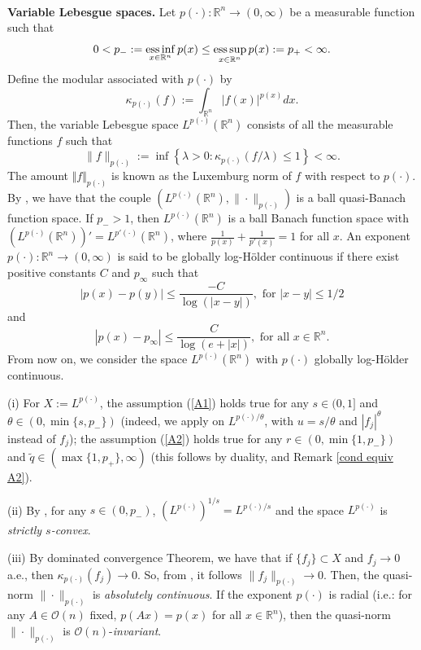 \documentclass[oneside,10pt]{article}
\newcommand\esssup{\mathop{\rm ess \, sup}}
\newcommand\essinf{\mathop{\rm ess \, inf}}
\begin{document}
\

{\bf Variable Lebesgue spaces.} Let $p(\cdot) : \mathbb{R}^n \to (0, \infty)$ be a measurable function such that
\[ 
0 < p_{-} := \essinf_{x \in \mathbb{R}^n} p(x) \leq \esssup_{x \in \mathbb{R}^n} p(x) : = p_{+} < \infty.
\]
Define the modular associated with $p(\cdot)$ by
\[
\kappa_{p(\cdot)}(f) := \int_{\mathbb{R}^n} |f(x)|^{p(x)} dx.
\]
Then, the variable Lebesgue space $L^{p(\cdot)}(\mathbb{R}^n)$ consists of all the measurable functions $f$ such that
\[
\| f \|_{p(\cdot)} := \inf \left\{ \lambda > 0 : \kappa_{p(\cdot)}(f/\lambda) \leq 1 \right\} < \infty.
\]
The amount $\Vert f \Vert_{p(\cdot)}$ is known as the Luxemburg norm of $f$ with respect to $p(\cdot)$. By \cite[Section 7.8]{sawa}, we have that the couple $(L^{p(\cdot)}(\mathbb{R}^n), \| \cdot \|_{p(\cdot)})$ is a ball quasi-Banach function space. If $p_{-} > 1$, then $L^{p(\cdot)}(\mathbb{R}^n)$ is a ball Banach function space with $(L^{p(\cdot)}(\mathbb{R}^n))' = L^{p'(\cdot)}(\mathbb{R}^n)$, where $\frac{1}{p(x)} + \frac{1}{p'(x)} = 1$ for all $x$. An exponent $p(\cdot) : \mathbb{R}^n \to (0, \infty)$ is said to be globally log-H\"older continuous if there exist positive constants $C$ and $p_{\infty}$ such that
\[
|p(x) - p(y)| \leq \frac{-C}{\log(|x-y|)}, \,\, \text{for} \,\, |x-y| \leq 1/2
\]
and
\[
|p(x) - p_{\infty}| \leq \frac{C}{\log(e + |x|)}, \,\, \text{for all} \,\, x \in \mathbb{R}^n.
\]
From now on, we consider the space $L^{p(\cdot)}(\mathbb{R}^n)$ with $p(\cdot)$ globally log-H\"older continuous.

(i) For $X:= L^{p(\cdot)}$, the assumption (\ref{A1}) holds true for any $s \in (0,1]$ and $\theta \in (0, \min\{s, p_{-}\})$ (indeed, we apply \cite[Lemma 2.4]{Nakai} on $L^{p(\cdot)/\theta}$, with $u=s/\theta$ and $|f_j|^{\theta}$ instead of $f_j$); the assumption (\ref{A2}) holds true for any $r \in (0, \min\{ 1, p_{-}\})$ and $\widetilde{q} \in (\max \{1, p_{+}\}, \infty)$ (this follows by duality, 
\cite[Theorem 1.5]{DCruz} and Remark \ref{cond equiv A2}).

(ii) By \cite[Proposition 2.18 and Theorem 2.61]{Fiorenza}, for any $s \in (0, p_{-})$, $(L^{p(\cdot)})^{1/s} = L^{p(\cdot)/s}$ and the space $L^{p(\cdot)}$ is \textit{strictly $s$-convex}.

(iii) By dominated convergence Theorem, we have that if $\{ f_j \} \subset X$ and $f_j \to 0$ a.e., then $\kappa_{p(\cdot)}(f_j) \to 0$. 
So, from \cite[Theorem 2.69]{Fiorenza}, it follows $\| f_j \|_{p(\cdot)} \to 0$. Then, the quasi-norm $\| \cdot \|_{p(\cdot)}$ is 
\textit{absolutely continuous}. If the exponent $p(\cdot)$ is radial (i.e.: for any $A \in \mathcal{O}(n)$ fixed, $p(Ax) = p(x)$ for all 
$x \in \mathbb{R}^n$), then the quasi-norm 
$\| \cdot \|_{p(\cdot)}$ is $\mathcal{O}(n)$-\textit{invariant}.
\end{document}
